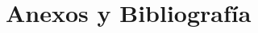 \documentclass[twoside,openright,titlepage,numbers=noenddot,headinclude,%
                footinclude=true,cleardoublepage=empty,abstractoff, %
                BCOR=20mm,a4paper,fontsize=11pt,%
                dottedtoc
                ]{scrreprt}
\begin{document}
\part{Anexos y Bibliograf\'ia}



\cleardoublepage
\cleardoublepage
\end{document}
